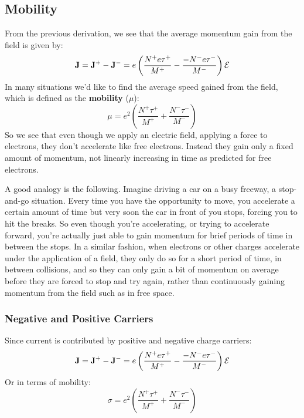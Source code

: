 \subsection{Mobility}
From the previous derivation, we see that the average momentum gain from the field is given by:
    \begin{equation}
        {\bf{J}} = {{\bf{J}}^ + } - {{\bf{J}}^ - } = e\left( {\frac{{{N^ + }e{\tau ^ + }}}{{{M^ + }}} - \frac{{ - {N^ - }e{\tau ^ - }}}{{{M^ - }}}} \right){\mathcal{E}}
    \end{equation}
In many situations we’d like to find the average speed gained from the field, which is defined as the \textbf{mobility} ($\mu$):
    \begin{equation}
        \mu  = {e^2}\left( {\frac{{{N^ + }{\tau ^ + }}}{{{M^ + }}} + \frac{{{N^ - }{\tau ^ - }}}{{{M^ - }}}} \right)
    \end{equation}
So we see that even though we apply an electric field, applying a force to electrons, they don't accelerate like free electrons.  Instead they gain only a fixed amount of momentum, not linearly increasing in time as predicted for free electrons.

A good analogy is the following.  Imagine driving a car on a busy freeway, a stop-and-go situation.  Every time you have the opportunity to move, you accelerate a certain amount of time but very soon the car in front of you stops, forcing you to hit the breaks.  So even though you're accelerating, or trying to accelerate forward, you're actually just able to gain momentum for brief periods of time in between the stops.  In a similar fashion, when electrons or other charges accelerate under the application of a field, they only do so for a short period of time, in between collisions, and so they can only gain a bit of  momentum on average before they are forced to stop and try again, rather than continuously gaining momentum from the field such as in free space.
\subsubsection{Negative and Positive Carriers}
Since current is contributed by positive and negative charge carriers:
    \begin{equation}
        {\bf{J}} = {{\bf{J}}^ + } - {{\bf{J}}^ - } = e\left( {\frac{{{N^ + }e{\tau ^ + }}}{{{M^ + }}} - \frac{{ - {N^ - }e{\tau ^ - }}}{{{M^ - }}}} \right){\mathcal{E}}
    \end{equation}
Or in terms of mobility:
    \begin{equation}
        \sigma  = {e^2}\left( {\frac{{{N^ + }{\tau ^ + }}}{{{M^ + }}} + \frac{{{N^ - }{\tau ^ - }}}{{{M^ - }}}} \right)
    \end{equation}
